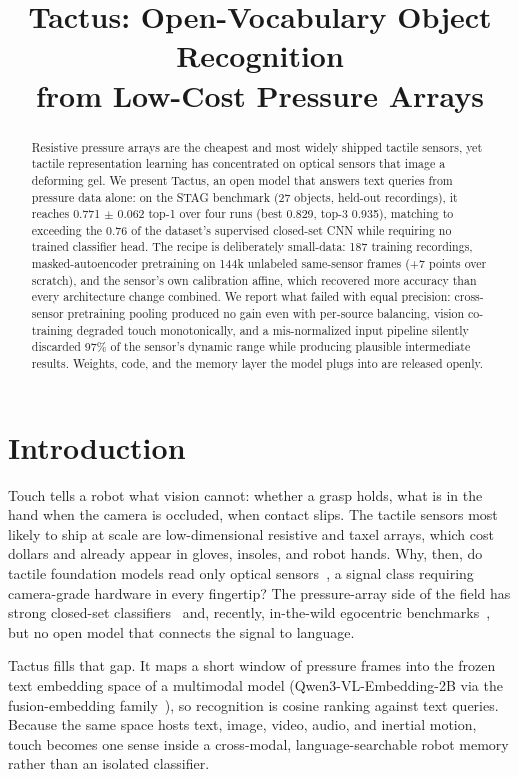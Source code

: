 \documentclass[conference]{IEEEtran}
\title{Tactus: Open-Vocabulary Object Recognition\\from Low-Cost Pressure Arrays}
\author{\IEEEauthorblockN{Abdul Basit Tonmoy}
\IEEEauthorblockA{Eximius Labs\\
\texttt{atonmoy27@wabash.edu}\\
\texttt{eximiuslabs.com}}}
\begin{document}
\maketitle

\begin{abstract}
Resistive pressure arrays are the cheapest and most widely shipped tactile sensors, yet
tactile representation learning has concentrated on optical sensors that image a deforming
gel. We present Tactus, an open model that answers text queries from pressure data alone:
on the STAG benchmark (27 objects, held-out recordings), it reaches 0.771 $\pm$ 0.062 top-1
over four runs (best 0.829, top-3 0.935), matching to exceeding the 0.76 of the dataset's
supervised closed-set CNN while requiring no trained classifier head. The recipe is
deliberately small-data: 187 training recordings, masked-autoencoder pretraining on 144k
unlabeled same-sensor frames (+7 points over scratch), and the sensor's own calibration
affine, which recovered more accuracy than every architecture change combined. We report
what failed with equal precision: cross-sensor pretraining pooling produced no gain even
with per-source balancing, vision co-training degraded touch monotonically, and a
mis-normalized input pipeline silently discarded 97\% of the sensor's dynamic range while
producing plausible intermediate results. Weights, code, and the memory layer the model
plugs into are released openly.
\end{abstract}

\section{Introduction}
Touch tells a robot what vision cannot: whether a grasp holds, what is in the hand when the
camera is occluded, when contact slips. The tactile sensors most likely to ship at scale
are low-dimensional resistive and taxel arrays, which cost dollars and already appear in
gloves, insoles, and robot hands. Why, then, do tactile foundation models read only optical
sensors~\cite{fu2024tvl,higuera2024sparsh}, a signal class requiring camera-grade hardware
in every fingertip? The pressure-array side of the field has strong closed-set
classifiers~\cite{sundaram2019stag} and, recently, in-the-wild egocentric
benchmarks~\cite{song2025opentouch}, but no open model that connects the signal to
language.

Tactus fills that gap. It maps a short window of pressure frames into the frozen text
embedding space of a multimodal model (Qwen3-VL-Embedding-2B via the fusion-embedding
family~\cite{tonmoy2026fusion}), so recognition is cosine ranking against text queries.
Because the same space hosts text, image, video, audio, and inertial motion, touch becomes
one sense inside a cross-modal, language-searchable robot memory rather than an isolated
classifier.
\end{document}
